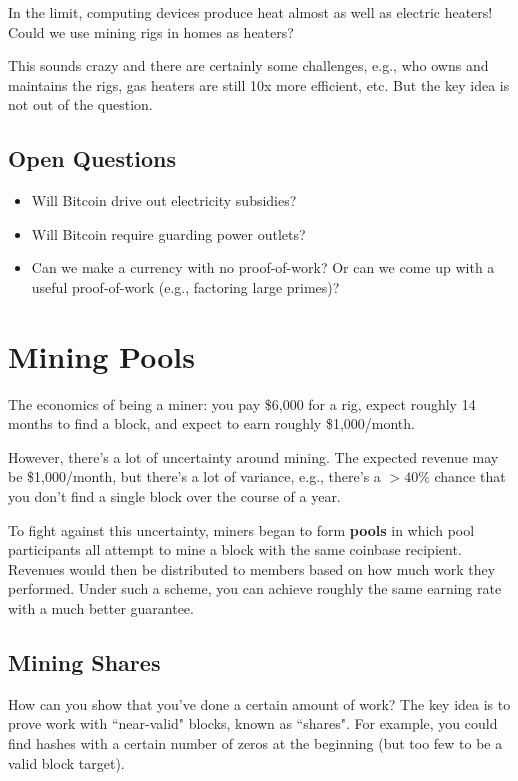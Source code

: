 \documentclass[12pt]{article}
\begin{document}
In the limit, computing devices produce heat almost as well as electric heaters! Could we use mining rigs in homes as heaters?

This sounds crazy and there are certainly some challenges, e.g., who owns and maintains the rigs, gas heaters are still 10x more efficient, etc. But the key idea is not out of the question.

\subsection*{Open Questions}

\begin{itemize}
\item Will Bitcoin drive out electricity subsidies?
\item Will Bitcoin require guarding power outlets?
\item Can we make a currency with no proof-of-work? Or can we come up with a useful proof-of-work (e.g., factoring large primes)?
\end{itemize}

\section*{Mining Pools}

The economics of being a miner: you pay \$6,000 for a rig, expect roughly 14 months to find a block, and expect to earn roughly \$1,000/month.

However, there's a lot of uncertainty around mining. The expected revenue may be \$1,000/month, but there's a lot of variance, e.g., there's a $> 40$\% chance that you don't find a single block over the course of a year.

To fight against this uncertainty, miners began to form \textbf{pools} in which pool participants all attempt to mine a block with the same coinbase recipient. Revenues would then be distributed to members based on how much work they performed. Under such a scheme, you can achieve roughly the same earning rate with a much better guarantee.

\subsection*{Mining Shares}

How can you show that you've done a certain amount of work? The key idea is to prove work with ``near-valid" blocks, known as ``shares". For example, you could find hashes with a certain number of zeros at the beginning (but too few to be a valid block target).
\end{document}
